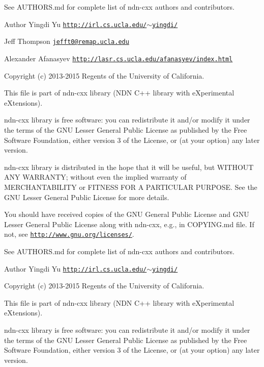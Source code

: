 See A\+U\+T\+H\+O\+R\+S.\+md for complete list of ndn-\/cxx authors and contributors.

\begin{DoxyAuthor}{Author}
Yingdi Yu \href{http://irl.cs.ucla.edu/~yingdi/}{\tt http\+://irl.\+cs.\+ucla.\+edu/$\sim$yingdi/} 

Jeff Thompson \href{mailto:jefft0@remap.ucla.edu}{\tt jefft0@remap.\+ucla.\+edu} 

Alexander Afanasyev \href{http://lasr.cs.ucla.edu/afanasyev/index.html}{\tt http\+://lasr.\+cs.\+ucla.\+edu/afanasyev/index.\+html}
\end{DoxyAuthor}
Copyright (c) 2013-\/2015 Regents of the University of California.

This file is part of ndn-\/cxx library (N\+DN C++ library with e\+Xperimental e\+Xtensions).

ndn-\/cxx library is free software\+: you can redistribute it and/or modify it under the terms of the G\+NU Lesser General Public License as published by the Free Software Foundation, either version 3 of the License, or (at your option) any later version.

ndn-\/cxx library is distributed in the hope that it will be useful, but W\+I\+T\+H\+O\+UT A\+NY W\+A\+R\+R\+A\+N\+TY; without even the implied warranty of M\+E\+R\+C\+H\+A\+N\+T\+A\+B\+I\+L\+I\+TY or F\+I\+T\+N\+E\+SS F\+OR A P\+A\+R\+T\+I\+C\+U\+L\+AR P\+U\+R\+P\+O\+SE. See the G\+NU Lesser General Public License for more details.

You should have received copies of the G\+NU General Public License and G\+NU Lesser General Public License along with ndn-\/cxx, e.\+g., in C\+O\+P\+Y\+I\+N\+G.\+md file. If not, see \href{http://www.gnu.org/licenses/}{\tt http\+://www.\+gnu.\+org/licenses/}.

See A\+U\+T\+H\+O\+R\+S.\+md for complete list of ndn-\/cxx authors and contributors.

\begin{DoxyAuthor}{Author}
Yingdi Yu \href{http://irl.cs.ucla.edu/~yingdi/}{\tt http\+://irl.\+cs.\+ucla.\+edu/$\sim$yingdi/}
\end{DoxyAuthor}
Copyright (c) 2013-\/2015 Regents of the University of California.

This file is part of ndn-\/cxx library (N\+DN C++ library with e\+Xperimental e\+Xtensions).

ndn-\/cxx library is free software\+: you can redistribute it and/or modify it under the terms of the G\+NU Lesser General Public License as published by the Free Software Foundation, either version 3 of the License, or (at your option) any later version.

